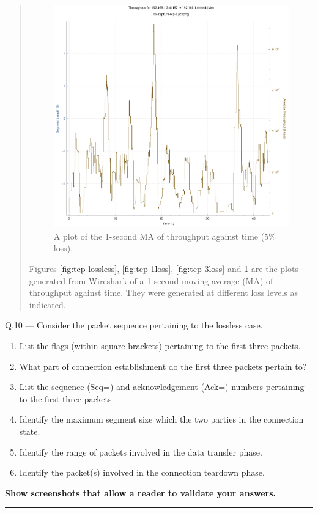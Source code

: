 \documentclass{article}
\newcommand\Que[2]{%
   \begin{samepage}
   \leavevmode\par
   \noindent
   Q.#1 --- #2\par\vspace{10pt}\hrule\vspace{10pt}
   \end{samepage}}
\newenvironment{ans}
   {\fbox{Answer}\begin{quote}\nopagebreak}
   {\end{quote}}
\begin{document}
\begin{ans}
\begin{figure}[H]
\centering
\includegraphics[width=16cm]{data/q9-1msav-throughput-5loss.pdf}
\caption{A plot of the 1-second MA of throughput against time
(5\% loss).}
\label{fig:tcp-5loss}
\end{figure}


Figures \ref{fig:tcp-lossless}, \ref{fig:tcp-1loss},
\ref{fig:tcp-3loss} and \ref{fig:tcp-5loss} are the plots
generated from Wireshark of a 1-second moving average (MA) of
throughput against time. They were generated at different loss
levels as indicated.




\end{ans}

\Que{10}{
Consider the packet sequence pertaining to the lossless case.
\begin{enumerate}
\item List the flags (within square brackets) pertaining to the
      first three packets.
\item What part of connection establishment do the first three
      packets pertain to?
\item List the sequence (Seq=) and acknowledgement (Ack=) numbers
      pertaining to the first three packets.
\item Identify the maximum segment size which the two parties in
      the connection state.
\item Identify the range of packets involved in the data transfer
      phase.
\item Identify the packet(s) involved in the connection teardown
      phase.
\end{enumerate}

\textbf{Show screenshots that allow a reader to validate your answers.}}
\end{document}
